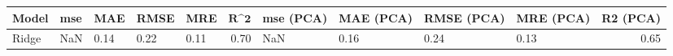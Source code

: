 \begin{table}
\centering
\label{table:iri_reg_pred}
\begin{tabular}{lllllrllllr}
\toprule
\textbf{Model} & \textbf{mse} & \textbf{MAE} & \textbf{RMSE} & \textbf{MRE} & $\textbf{R^2}$ & \textbf{mse (PCA)} & \textbf{MAE (PCA)} & \textbf{RMSE (PCA)} & \textbf{MRE (PCA)} & \textbf{R2 (PCA)} \\
\midrule
         Ridge &          NaN &         0.14 &          0.22 &         0.11 &           0.70 &                NaN &               0.16 &                0.24 &               0.13 &              0.65 \\
\bottomrule
\end{tabular}
\end{table}
